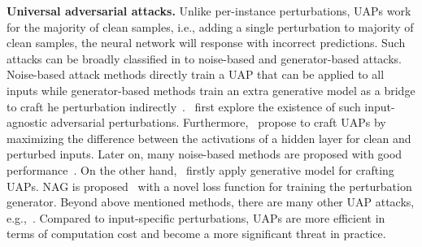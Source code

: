 \textbf{Universal adversarial attacks.} Unlike per-instance perturbations, UAPs work for the majority of clean samples, i.e., adding a single perturbation to majority of clean samples, the neural network will response with incorrect predictions. Such attacks can be broadly classified in to noise-based and generator-based attacks. Noise-based attack methods directly train a UAP that can be applied to all inputs while generator-based methods train an extra generative model as a bridge to craft he perturbation indirectly~\citep{uap_survey}.~\citet{uap} first explore the existence of such input-agnostic adversarial perturbations. 
Furthermore,~\citet{singular} propose to craft UAPs by maximizing the difference between the activations of a hidden layer for clean and perturbed inputs. Later on, many noise-based methods are proposed with good performance~\citep{FFF,datafree}. 
On the other hand,~\citet{gap} firstly apply generative model for crafting UAPs. %
NAG is proposed~\citep{nag} with a novel loss function for training the perturbation generator. 
Beyond above mentioned methods, there are many other UAP attacks, e.g.,~\citep{double,singular,cduap,face,speech}. Compared to input-specific perturbations, UAPs are more efficient in terms of computation cost and become a more significant threat in practice.

